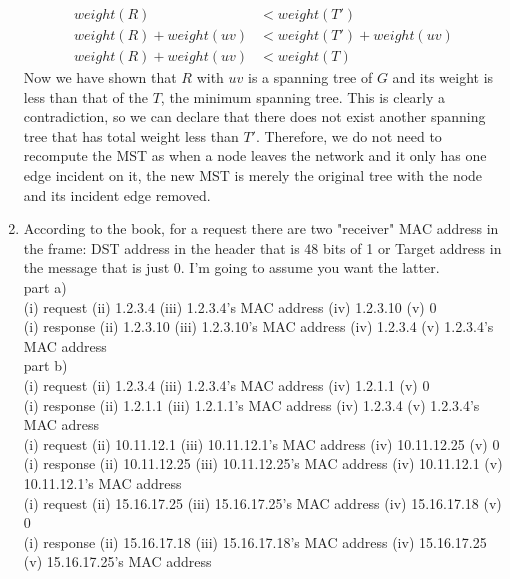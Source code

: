 \documentclass[12pt]{article}
\begin{document}
\begin{enumerate}
	\begin{align*}
	weight(R) &< weight(T')\\
	weight(R) + weight(uv) &< weight(T') + weight(uv)\\
	weight(R) + weight(uv) &< weight(T)
	\end{align*}
	Now we have shown that $R$ with $uv$ is a spanning tree of $G$ and its weight is less than that of the $T$, the minimum spanning tree. This is clearly a contradiction, so we can declare that there does not exist another spanning tree that has total weight less than $T'$. Therefore, we do not need to recompute the MST as when a node leaves the network and it only has one edge incident on it, the new MST is merely the original tree with the node and its incident edge removed.
	\item
        According to the book, for a request there are two "receiver" MAC address in the frame:
        DST address in the header that is 48 bits of 1 or Target address in the message
        that is just 0. I'm going to assume you want the latter. \\

        part a) \\
        (i) request (ii) 1.2.3.4 (iii) 1.2.3.4's MAC address (iv) 1.2.3.10 (v) 0 \\
        (i) response (ii) 1.2.3.10 (iii) 1.2.3.10's MAC address (iv) 1.2.3.4 (v) 1.2.3.4's MAC address \\

        part b) \\
        (i) request (ii) 1.2.3.4 (iii) 1.2.3.4's MAC address (iv) 1.2.1.1 (v) 0 \\
        (i) response (ii) 1.2.1.1 (iii) 1.2.1.1's MAC address (iv) 1.2.3.4 (v) 1.2.3.4's MAC adress \\
        (i) request (ii) 10.11.12.1 (iii) 10.11.12.1's MAC address (iv) 10.11.12.25 (v) 0 \\
        (i) response (ii) 10.11.12.25 (iii) 10.11.12.25's MAC address (iv) 10.11.12.1 (v) 10.11.12.1's MAC address \\
        (i) request (ii) 15.16.17.25 (iii) 15.16.17.25's MAC address (iv) 15.16.17.18 (v) 0 \\
        (i) response (ii) 15.16.17.18 (iii) 15.16.17.18's MAC address (iv) 15.16.17.25 (v) 15.16.17.25's MAC address \\

\end{enumerate}
\end{document}
